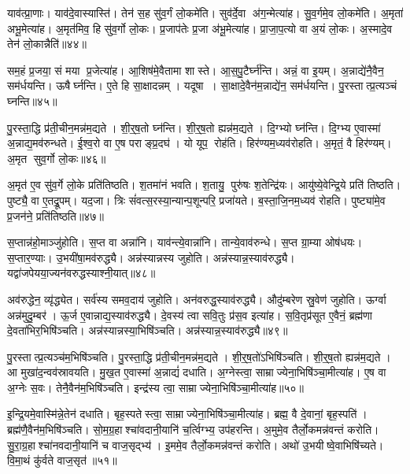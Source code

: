 याव॑त्प्रा॒णाः।
याव॑दे॒वास्यास्ति॑।
तेन॑ स॒ह सु॑व॒र्गं लो॒कमे॑ति।
सुव॑र्दे॒वा अ॑ग॒न्मेत्या॑ह।
सु॒व॒र्गमे॒व लो॒कमे॑ति।
अ॒मृता॑ अभू॒मेत्या॑ह।
अ॒मृत॑मिव॒ हि सु॑व॒र्गो लो॒कः।
प्र॒जाप॑तेः प्र॒जा अ॑भू॒मेत्या॑ह।
प्रा॒जा॒प॒त्यो वा अ॒यं लो॒कः।
अ॒स्मादे॒व तेन॑ लो॒कान्नैति॑॥४४॥

सम॒हं प्र॒जया॒ सं मया प्र॒जेत्या॑ह।
आ॒शिष॑मे॒वैतामा शास्ते।
आ॒स॒पु॒टैर्घ्न॑न्ति।
अन्नं॒ वा इ॒यम्।
अ॒न्नाद्ये॑नै॒वैन॒ सम॑र्धयन्ति।
ऊषैर्घ्नन्ति।
ए॒ते हि सा॒क्षादन्नम्।
यदूषा।
सा॒क्षादे॒वैन॑म॒न्नाद्ये॑न॒ सम॑र्धयन्ति।
पु॒रस्तात्प्र॒त्यञ्चं घ्नन्ति॥४५॥

पु॒रस्ता॒द्धि प्र॑ती॒चीन॒मन्न॑म॒द्यते।
शी॒र्॒ष॒तो घ्न॑न्ति।
शी॒र्॒ष॒तो ह्यन्न॑म॒द्यते।
दि॒ग्भ्यो घ्न॑न्ति।
दि॒ग्भ्य ए॒वास्मा॑ अ॒न्नाद्य॒मव॑रुन्धते।
ई॒श्व॒रो वा ए॒ष पराङ्प्र॒दघ॑।
यो यूप॒ रोह॑ति।
हिर॑ण्यम॒ध्यव॑रोहति।
अ॒मृतं॒ वै हिर॑ण्यम्।
अ॒मृत सुव॒र्गो लो॒कः॥४६॥

अ॒मृत॑ ए॒व सु॑व॒र्गे लो॒के प्रति॑तिष्ठति।
श॒तमा॑नं भवति।
श॒तायु॒ पुरु॑षः श॒तेन्द्रि॑यः।
आयु॑ष्ये॒वेन्द्रि॒ये प्रति॑ तिष्ठति।
पुष्ट्यै॒ वा ए॒तद्रू॒पम्।
यद॒जा।
त्रिः सं॑वत्स॒रस्या॒न्यान्प॒शून्परि॒ प्रजा॑यते।
ब॒स्ता॒जि॒नम॒ध्यव॑ रोहति।
पुष्ट्या॑मे॒व प्र॒जन॑ने॒ प्रति॑तिष्ठति॥४७॥\anuvakamend[प॒रि॒धा॒पय॑ति गो॒धूमा॑ जुहोति॒ स्वं नैति॑ प्र॒त्यञ्चं घ्नन्ति लो॒को नव॑ च]

स॒प्तान्न॑हो॒माञ्जु॑होति।
स॒प्त वा अन्ना॑नि।
याव॑न्त्ये॒वान्ना॑नि।
तान्ये॒वाव॑रुन्धे।
स॒प्त ग्रा॒म्या ओष॑धयः।
स॒प्तार॒ण्याः।
उ॒भयी॑षा॒मव॑रुद्ध्यै।
अन्न॑स्यान्नस्य जुहोति।
अन्न॑स्यान्न॒स्या\-व॑रुद्ध्यै।
यद्वा॑जपेयया॒ज्यन॑वरुद्धस्याश्नी॒यात्॥४८॥

अव॑रुद्धेन॒ व्यृ॑द्ध्येत।
सर्व॑स्य समव॒दाय॑ जुहोति।
अन॑वरुद्ध॒स्याव॑रुद्ध्यै।
औदु॑म्बरेण स्रु॒वेण॑ जुहोति।
ऊर्ग्वा अन्न॑मुदु॒म्बर॑।
ऊ॒र्ज ए॒वान्नाद्य॒स्याव॑रुद्ध्यै।
दे॒वस्य॑ त्वा सवि॒तुः प्र॑स॒व इत्या॑ह।
स॒वि॒तृप्र॑सूत ए॒वैनं॒ ब्रह्म॑णा दे॒वता॑भिर॒भिषि॑ञ्चति।
अन्न॑स्यान्नस्या॒भिषि॑ञ्चति।
अन्न॑स्यान्न॒स्याव॑रुद्ध्यै॥४९॥

पु॒रस्तात्प्र॒त्यञ्च॑म॒भिषि॑ञ्चति।
पु॒रस्ता॒द्धि प्र॑ती॒चीन॒मन्न॑म॒द्यते।
शी॒र्॒ष॒तो॑ऽभिषि॑ञ्चति।
शी॒र्॒ष॒तो ह्यन्न॑म॒द्यते।
आ मुखा॑द॒न्वव॑स्रावयति।
मु॒ख॒त ए॒वास्मा॑ अ॒न्नाद्यं॑ दधाति।
अ॒ग्नेस्त्वा॒ साम्राज्येना॒भिषि॑ञ्चा॒मीत्या॑ह।
ए॒ष वा अ॒ग्नेः स॒वः।
तेनै॒वैन॑म॒भिषि॑ञ्चति।
इन्द्र॑स्य त्वा॒ साम्राज्येना॒भिषि॑ञ्चा॒मीत्या॑ह॥५०॥

इ॒न्द्रि॒यमे॒वास्मि॑न्ने॒तेन॑ दधाति।
बृह॒स्पतेस्त्वा॒ साम्राज्येना॒भि\-षि॑ञ्चा॒मीत्या॑ह।
ब्रह्म॒ वै दे॒वानां॒ बृह॒स्पति॑।
ब्रह्म॑णै॒वैन॑म॒भि\-षि॑ञ्चति।
सो॒म॒ग्र॒हाश्चा॑वदानी॒यानि॑ च॒र्त्विग्भ्य॒ उप॑हरन्ति।
अ॒मुमे॒व तैर्लो॒कमन्न॑वन्तं करोति।
सु॒रा॒ग्र॒हाश्चा॑नवदानी॒यानि॑ च वाज॒सृद्भ्य॑।
इ॒ममे॒व तैर्लो॒कमन्न॑वन्तं करोति।
अथो॑ उ॒भयीष्वे॒वाभिषि॑च्यते।
वि॒मा॒थं कु॑र्वते वाज॒सृत॑॥५१॥

